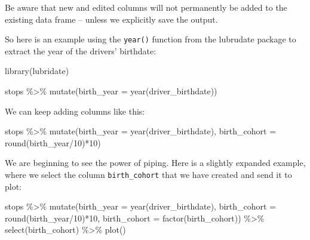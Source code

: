 \documentclass[
]{book}
\newenvironment{Shaded}{\begin{snugshade}}{\end{snugshade}}
\newcommand{\AttributeTok}[1]{\textcolor[rgb]{0.77,0.63,0.00}{#1}}
\newcommand{\DecValTok}[1]{\textcolor[rgb]{0.00,0.00,0.81}{#1}}
\newcommand{\FunctionTok}[1]{\textcolor[rgb]{0.00,0.00,0.00}{#1}}
\newcommand{\NormalTok}[1]{#1}
\newcommand{\SpecialCharTok}[1]{\textcolor[rgb]{0.00,0.00,0.00}{#1}}
\begin{document}
Be aware that new and edited columns will not permanently be added to the existing data frame -- unless we explicitly save the output.

So here is an example using the \texttt{year()} function from the lubrudate package to extract the year of the drivers' birthdate:

\begin{Shaded}
\begin{Highlighting}[]
\FunctionTok{library}\NormalTok{(lubridate)}

\NormalTok{stops }\SpecialCharTok{\%\textgreater{}\%} 
  \FunctionTok{mutate}\NormalTok{(}\AttributeTok{birth\_year =} \FunctionTok{year}\NormalTok{(driver\_birthdate))}
\end{Highlighting}
\end{Shaded}

We can keep adding columns like this:

\begin{Shaded}
\begin{Highlighting}[]
\NormalTok{stops }\SpecialCharTok{\%\textgreater{}\%} 
  \FunctionTok{mutate}\NormalTok{(}\AttributeTok{birth\_year =} \FunctionTok{year}\NormalTok{(driver\_birthdate),}
         \AttributeTok{birth\_cohort =} \FunctionTok{round}\NormalTok{(birth\_year}\SpecialCharTok{/}\DecValTok{10}\NormalTok{)}\SpecialCharTok{*}\DecValTok{10}\NormalTok{) }
\end{Highlighting}
\end{Shaded}

We are beginning to see the power of piping. Here is a slightly expanded example, where we select the column \texttt{birth\_cohort} that we have created and send it to plot:

\begin{Shaded}
\begin{Highlighting}[]
\NormalTok{stops }\SpecialCharTok{\%\textgreater{}\%} 
  \FunctionTok{mutate}\NormalTok{(}\AttributeTok{birth\_year =} \FunctionTok{year}\NormalTok{(driver\_birthdate),}
         \AttributeTok{birth\_cohort =} \FunctionTok{round}\NormalTok{(birth\_year}\SpecialCharTok{/}\DecValTok{10}\NormalTok{)}\SpecialCharTok{*}\DecValTok{10}\NormalTok{,}
         \AttributeTok{birth\_cohort =} \FunctionTok{factor}\NormalTok{(birth\_cohort)) }\SpecialCharTok{\%\textgreater{}\%}
    \FunctionTok{select}\NormalTok{(birth\_cohort) }\SpecialCharTok{\%\textgreater{}\%} 
    \FunctionTok{plot}\NormalTok{()}
\end{Highlighting}
\end{Shaded}
\end{document}
